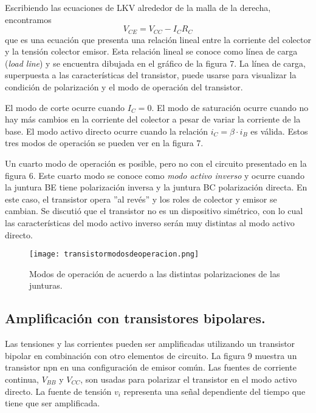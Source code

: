 \documentclass[12pt,a4paper]{article}
\begin{document}
Escribiendo las ecuaciones de LKV alrededor de la malla de la derecha, encontramos
\[ V_{CE}=V_{CC}-I_{C}R_{C} \]
que es una ecuación que presenta una relación lineal entre la corriente del colector y la tensión colector emisor. Esta relación lineal se conoce como línea de carga (\emph{load line}) y se encuentra dibujada en el gráfico de la figura 7. La línea de carga, superpuesta a las características del transistor, puede usarse para visualizar la condición de polarización y el modo de operación del transistor.

El modo de corte ocurre cuando $I_{C}=0$. El modo de saturación ocurre cuando no hay más cambios en la corriente del colector a pesar de variar la corriente de la base. El modo activo directo ocurre cuando la relación $i_{C}=\beta \cdot i_{B}$ es válida. Estos tres modos de operación se pueden ver en la figura 7.

Un cuarto modo de operación es posible, pero no con el circuito presentado en la figura 6. Este cuarto modo se conoce como \emph{modo activo inverso} y ocurre cuando la juntura BE tiene polarización inversa y la juntura BC polarización directa. En este caso, el transistor opera ''al revés'' y los roles de colector y emisor se cambian. Se discutió que el transistor no es un dispositivo simétrico, con lo cual las características del modo activo inverso serán muy distintas al modo activo directo.

\begin{figure}[ht!]
\begin{center}
\texttt{[image: transistormodosdeoperacion.png]}
\caption{Modos de operación de acuerdo a las distintas polarizaciones de las junturas.}
\end{center}
\end{figure}

\subsection{Amplificación con transistores bipolares.}

Las tensiones y las corrientes pueden ser amplificadas utilizando un transistor bipolar en combinación con otro elementos de circuito. La figura 9 muestra un transistor npn en una configuración de emisor común. Las fuentes de corriente continua, $V_{BB}$ y $V_{CC}$, son usadas para polarizar el transistor en el modo activo directo. La fuente de tensión $v_{i}$ representa una señal dependiente del tiempo que tiene que ser amplificada.
\end{document}
